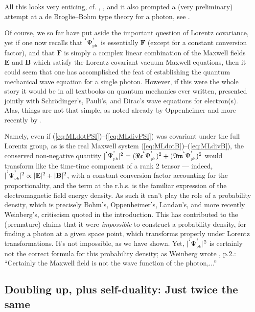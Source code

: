\documentclass[12pt]{article}
\theoremstyle{definition}
\newcommand{\refeq}[1]{(\ref{#1})}
\numberwithin{equation}{section}
\newcommand{\fe}{\mathfrak{e}}
\newcommand{\fm}{\mathfrak{m}}
\newcommand{\bB}{\mathbf{B}}
\newcommand{\bE}{\mathbf{E}}
\newcommand{\bF}{\mathbf{F}}
\newcommand{\PsiPh}{{}^{\mbox{\textrm{`}}}{\Psi_{\mbox{\rm\tiny ph}}^{\mbox{\textrm{'}}}}}
\begin{document}
\noindent
 All this looks very enticing, cf. \cite{SmithRaymer}, \cite{Chandrasekar}, and it also prompted 
a (very preliminary) attempt at a de Broglie--Bohm type theory for a photon, see \cite{Esposito}.

 Of course, we so far have put aside the important question of Lorentz covariance, yet if one now recalls that $\PsiPh$ is essentially
$\bF$ (except for a constant conversion factor), and that $\bF$ is simply a complex linear combination of the Maxwell fields $\bE$ and $\bB$
which satisfy the Lorentz covariant vacuum Maxwell equations, then it could seem that one has accomplished the feat of establishing
the quantum mechanical wave equation for  a single photon. 
  However, if this were the whole story it would be in all textbooks on quantum mechanics ever written, presented jointly with Schr\"odinger's,
Pauli's,  and Dirac's wave equations for electron(s). 
 Alas, things are not that simple, as noted already by Oppenheimer \cite{OppiPHOTON} and more recently by \cite{Cugnon}.

 Namely, even if \refeq{eq:MLdotPSI}--\refeq{eq:MLdivPSI} was covariant under the full Lorentz group, as is
the real Maxwell system \refeq{eq:MLdotB}--\refeq{eq:MLdivB}, the conserved non-negative quantity 
$|\PsiPh|^2 = (\Re\fe\PsiPh)^2 + (\Im\fm\PsiPh)^2$ would transform like the time-time component of a rank 2 tensor --- indeed,
$|\PsiPh|^2 \propto |\bE|^2 + |\bB|^2$, with a constant conversion factor accounting for the proportionality, and the term at
the r.h.s. is the familiar expression of the electromagnetic field energy density. 
 As such it can't play the role of a probability density, 
which is precisely Bohm's, Oppenheimer's, Landau's, and more recently Weinberg's, critiscism quoted in the introduction.
 This has contributed to the (premature) claims that it were \emph{impossible} to construct a probability 
density, for finding a photon at a given space point, which transforms properly under Lorentz transformations.
 It's not impossible, as we have shown.
 Yet, $|\PsiPh|^2$ is certainly not the correct formula for this probability density;
as Weinberg wrote \cite{WeinbergTALK}, p.2.: ``Certainly the Maxwell field is not the wave function of the photon,...'' 

\subsection{Doubling up, plus self-duality: Just twice the same}\label{sec:selfDUAL}
\end{document}
